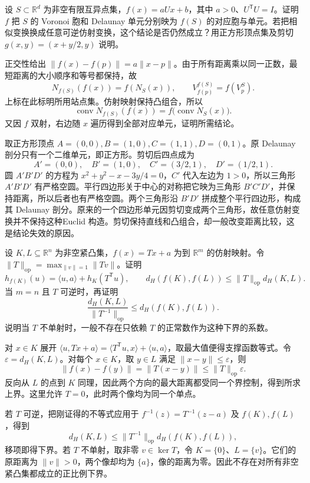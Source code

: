 \begin{exercise}\label{g1:ex:voronoi-similarity}
	设 \(S\subset\mathbb R^d\) 为非空有限互异点集，\(f(x)=aUx+b\)，其中 \(a>0\)、\(U^{\mathsf T}U=I\)。证明 \(f\) 把 \(S\) 的 Voronoi 胞和 Delaunay 单元分别映为 \(f(S)\) 的对应胞与单元。若把相似变换换成任意可逆仿射变换，这个结论是否仍然成立？用正方形顶点集及剪切 \(g(x,y)=(x+y/2,y)\) 说明。
\end{exercise}
\begin{solution}
	正交性给出 \(\lVert f(x)-f(p)\rVert=a\lVert x-p\rVert\)。由于所有距离乘以同一正数，最短距离的大小顺序和等号都保持，故
	\[
		N_{f(S)}(f(x))=f(N_S(x)),\qquad
		V^{f(S)}_{f(p)}=f(V^S_p).
	\]
	上标在此标明所用站点集。仿射映射保持凸组合，所以
	\[
		\operatorname{conv}N_{f(S)}(f(x))
		=f\bigl(\operatorname{conv}N_S(x)\bigr).
	\]
	又因 \(f\) 双射，右边随 \(x\) 遍历得到全部对应单元，证明所需结论。

	取正方形顶点 \(A=(0,0),B=(1,0),C=(1,1),D=(0,1)\)。原 Delaunay 剖分只有一个二维单元，即正方形。剪切后四点成为
	\[
		A'=(0,0),\quad B'=(1,0),\quad C'=(3/2,1),\quad D'=(1/2,1).
	\]
	圆 \(A'B'D'\) 的方程为 \(x^2+y^2-x-3y/4=0\)，\(C'\) 代入左边为 \(1>0\)，所以三角形 \(A'B'D'\) 有严格空圆。平行四边形关于中心的对称把它映为三角形 \(B'C'D'\)，并保持距离，所以后者也有严格空圆。两个三角形沿 \(B'D'\) 拼成整个平行四边形，构成其 Delaunay 剖分。原来的一个四边形单元因剪切变成两个三角形，故任意仿射变换并不保持这种Euclid 构造。剪切保持直线和凸组合，却一般改变距离比较，这是结论失效的原因。
\end{solution}

\begin{exercise}\label{g1:ex:hausdorff-affine-stability}
	设 \(K,L\subseteq\mathbb R^n\) 为非空紧凸集，\(f(x)=Tx+a\) 为到 \(\mathbb R^m\) 的仿射映射。令 \(\lVert T\rVert_{\mathrm{op}}=\max_{\lVert v\rVert=1}\lVert Tv\rVert\)。证明
	\[
		h_{f(K)}(u)=\langle u,a\rangle+h_K(T^{\mathsf T}u),\qquad
		d_H(f(K),f(L))\le\lVert T\rVert_{\mathrm{op}}d_H(K,L).
	\]
	当 \(m=n\) 且 \(T\) 可逆时，再证明
	\[
		\frac{d_H(K,L)}{\lVert T^{-1}\rVert_{\mathrm{op}}}
		\le d_H(f(K),f(L)).
	\]
	说明当 \(T\) 不单射时，一般不存在只依赖 \(T\) 的正常数作为这种下界的系数。
\end{exercise}
\begin{solution}
	对 \(x\in K\) 展开 \(\langle u,Tx+a\rangle=\langle T^{\mathsf T}u,x\rangle+\langle u,a\rangle\)，取最大值便得支撑函数等式。令 \(\varepsilon=d_H(K,L)\)。对每个 \(x\in K\)，取 \(y\in L\) 满足 \(\lVert x-y\rVert\le\varepsilon\)，则
	\[
		\lVert f(x)-f(y)\rVert=\lVert T(x-y)\rVert
		\le\lVert T\rVert_{\mathrm{op}}\varepsilon.
	\]
	反向从 \(L\) 的点到 \(K\) 同理，因此两个方向的最大距离都受同一个界控制，得到所求上界。这里允许 \(T=0\)，此时两个像均为同一个单点。

	若 \(T\) 可逆，把刚证得的不等式应用于 \(f^{-1}(z)=T^{-1}(z-a)\) 及 \(f(K),f(L)\)，得到
	\[
		d_H(K,L)\le\lVert T^{-1}\rVert_{\mathrm{op}}d_H(f(K),f(L)),
	\]
	移项即得下界。若 \(T\) 不单射，取非零 \(v\in\ker T\)，令 \(K=\{0\}\)、\(L=\{v\}\)。它们的原距离为 \(\lVert v\rVert>0\)，两个像却均为 \(\{a\}\)，像的距离为零。因此不存在对所有非空紧凸集都成立的正比例下界。
\end{solution}


